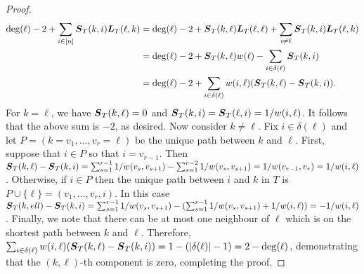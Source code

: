 \begin{proof}
\begin{align*}
\deg(\ell) - 2 + \sum_{i\in [n]} \vb*{S}_T(k,i)\vb*{L}_T(\ell,k) &= \deg(\ell) - 2 + \vb*{S}_T(k,\ell)\vb*{L}_T(\ell,\ell) + \sum_{i\neq \ell} \vb*{S}_T(k,i)\vb*{L}_T(\ell,k)\\
&= \deg(\ell) -2 + \vb*{S}_T(k,\ell)w(\ell) - \sum_{i\in\delta(\ell)} \vb*{S}_T(k,i) \\
&= \deg(\ell) -2 + \sum_{i\in\delta(\ell)}w(i,\ell)(\vb*{S}_T(k,\ell) - \vb*{S}_T(k,i)).
\end{align*}
For $k=\ell$, we have $\vb*{S}_T(k,\ell)=0$ and $\vb*{S}_T(k,i)=\vb*{S}_T(\ell,i) = 1/w(i,\ell)$. It  follows that the above sum is $-2$, as desired. 
Now consider $k\neq \ell$. 
Fix $i\in \delta(\ell)$ and let $P=(k=v_1,\dots,v_r=\ell)$ be the unique path between $k$  and $\ell$. First, suppose that $i\in P$ so that $i=v_{r-1}$. Then $\vb*{S}_T(k,\ell) - \vb*{S}_T(k,i) = \sum_{s=1}^{r-1}1/w(v_s,v_{s+1}) - \sum_{s=1}^{r-2} 1/w(v_s,v_{s+1}) = 1/w(v_{r-1},v_r) = 1/w(i,\ell)$. Otherwise,  if $i\in P$ then the unique path  between $i$ and $k$ in $T$ is $P\cup\{\ell\} = (v_1,\dots,v_r,i)$. In  this case  $\vb*{S}_T(k,ell) - \vb*{S}_T(k,i) = \sum_{s=1}^{r-1}1/w(v_s,v_{s+1}) - (\sum_{s=1}^{r-1} 1/w(v_s,v_{s+1}) + 1/w(i,\ell)) = - 1/w(i,\ell)$. Finally, we note that there can be at most one neighbour of $\ell$ which is on the shortest path between $k$ and $\ell$. Therefore, 
$\sum_{i\in\delta(\ell)}w(i,\ell)(\vb*{S}_T(k,\ell)-\vb*{S}_T(k,i)) = 1-(|\delta(\ell)|-1) = 2 - \deg(\ell)$, demonstrating that the $(k,\ell)$-th component is zero, completing the proof. 
\end{proof}

